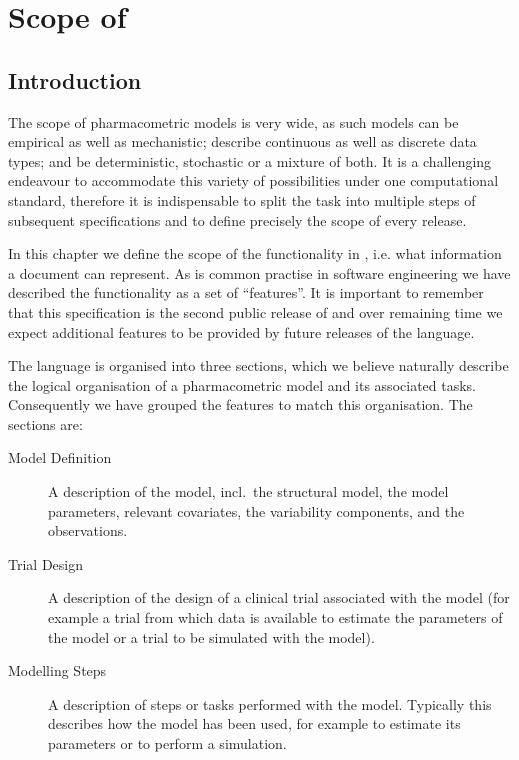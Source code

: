 
\chapter{Scope of \pharmml} 
\label{chap:scope}


\section{Introduction}

The scope of pharmacometric models is very wide, as such models can be empirical as well as
mechanistic; describe continuous as well as discrete data types; and be deterministic, stochastic
or a mixture of both. It is a challenging endeavour to accommodate this variety of possibilities
under one computational standard, therefore it is indispensable to split the task into multiple
steps of subsequent specifications and to define precisely the scope of every release.

In this chapter we define the scope of the functionality in
\pharmml, i.e. what information a \pharmml document can
represent. As is common practise in software engineering we have 
described the functionality as a set of ``features''.  It is important to remember 
that this specification is the second public release of \pharmml and over remaining 
time we expect additional features to be provided by future releases of the language.

The language is organised into three sections, which we believe naturally
describe the logical organisation of a pharmacometric model and its
associated tasks. Consequently we have grouped the features to match this
organisation. The sections are:
\begin{description}
\item[Model Definition] A description of the model, incl.\ the structural model, the model
  parameters, relevant covariates, the variability components, and the observations.
\item[Trial Design] A description of the design of a clinical trial associated with the model
  (for example a trial from which data is available to estimate the parameters of the model or
  a trial to be simulated with the model).
\item[Modelling Steps] A description of steps or tasks performed with
  the model. Typically this describes how the model has been used, for
  example to estimate its parameters or to perform a simulation.
\end{description}

